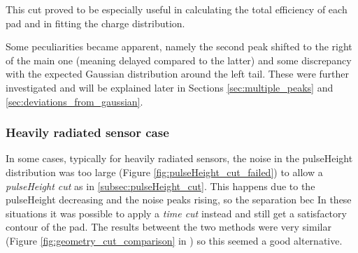 This cut proved to be especially useful in calculating the total efficiency of each pad and in fitting the charge distribution.

Some peculiarities became apparent, namely the second peak shifted to the right of the main one (meaning delayed compared to the latter) and some discrepancy with the expected Gaussian distribution around the left tail. These were further investigated and will be explained later in Sections \ref{sec:multiple_peaks} and \ref{sec:deviations_from_gaussian}.

\subsubsection{Heavily radiated sensor case}\label{subsec:geometry_cut_w/pulse_cut}

In some cases, typically for heavily radiated sensors, the noise in the pulseHeight distribution was too large (Figure \ref{fig:pulseHeight_cut_failed}) to allow a \textit{pulseHeight cut} as in \ref{subsec:pulseHeight_cut}. This happens due to the pulseHeight decreasing and the noise peaks rising, so the separation bec In these situations it was possible to apply a \textit{time cut} instead and still get a satisfactory contour of the pad. The results betweent the two methods were very similar (Figure \ref{fig:geometry_cut_comparison} in ) so this seemed a good alternative.


